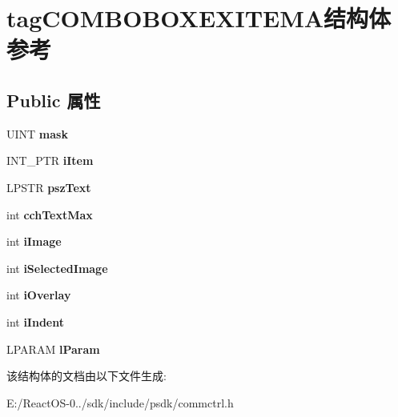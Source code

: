 \hypertarget{structtag_c_o_m_b_o_b_o_x_e_x_i_t_e_m_a}{}\section{tag\+C\+O\+M\+B\+O\+B\+O\+X\+E\+X\+I\+T\+E\+M\+A结构体 参考}
\label{structtag_c_o_m_b_o_b_o_x_e_x_i_t_e_m_a}
\subsection*{Public 属性}
\begin{DoxyCompactItemize}
\item 
\mbox{\label{structtag_c_o_m_b_o_b_o_x_e_x_i_t_e_m_a_a840c5cd37014a1c7b2fa7ffeca0e9592}} 
U\+I\+NT {\bfseries mask}
\item 
\mbox{\label{structtag_c_o_m_b_o_b_o_x_e_x_i_t_e_m_a_a1eae8344b307f5cfd5ab7f31ff3336c4}} 
I\+N\+T\+\_\+\+P\+TR {\bfseries i\+Item}
\item 
\mbox{\label{structtag_c_o_m_b_o_b_o_x_e_x_i_t_e_m_a_afe55ea0b5c0385c30795df2a1d89e344}} 
L\+P\+S\+TR {\bfseries psz\+Text}
\item 
\mbox{\label{structtag_c_o_m_b_o_b_o_x_e_x_i_t_e_m_a_a1c4e08fbfaf29a711ddedf5788c44776}} 
int {\bfseries cch\+Text\+Max}
\item 
\mbox{\label{structtag_c_o_m_b_o_b_o_x_e_x_i_t_e_m_a_aa76232893278316cc6402e4b9ccffaaf}} 
int {\bfseries i\+Image}
\item 
\mbox{\label{structtag_c_o_m_b_o_b_o_x_e_x_i_t_e_m_a_a3394f5ef8f80428efa22bc5283729e87}} 
int {\bfseries i\+Selected\+Image}
\item 
\mbox{\label{structtag_c_o_m_b_o_b_o_x_e_x_i_t_e_m_a_ab68b087edb95791dcad97e8d91c0abf0}} 
int {\bfseries i\+Overlay}
\item 
\mbox{\label{structtag_c_o_m_b_o_b_o_x_e_x_i_t_e_m_a_ac7eae25932e5c1185a61af7bba0487e4}} 
int {\bfseries i\+Indent}
\item 
\mbox{\label{structtag_c_o_m_b_o_b_o_x_e_x_i_t_e_m_a_af61ae675700cc6d7905c8f97b7b515ff}} 
L\+P\+A\+R\+AM {\bfseries l\+Param}
\end{DoxyCompactItemize}


该结构体的文档由以下文件生成\+:\begin{DoxyCompactItemize}
\item 
E\+:/\+React\+O\+S-\/0../sdk/include/psdk/commctrl.\+h\end{DoxyCompactItemize}
